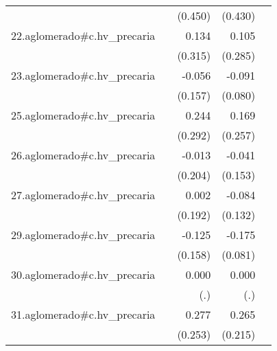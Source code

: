 {\begin{longtable}{l*{4}{D{.}{.}{-1}}}
            &                     &     (0.450)         &     (0.430)         &                     \\
\addlinespace
22.aglomerado#c.hv\_precaria&                     &       0.134         &       0.105         &                     \\
            &                     &     (0.315)         &     (0.285)         &                     \\
\addlinespace
23.aglomerado#c.hv\_precaria&                     &      -0.056         &      -0.091         &                     \\
            &                     &     (0.157)         &     (0.080)         &                     \\
\addlinespace
25.aglomerado#c.hv\_precaria&                     &       0.244         &       0.169         &                     \\
            &                     &     (0.292)         &     (0.257)         &                     \\
\addlinespace
26.aglomerado#c.hv\_precaria&                     &      -0.013         &      -0.041         &                     \\
            &                     &     (0.204)         &     (0.153)         &                     \\
\addlinespace
27.aglomerado#c.hv\_precaria&                     &       0.002         &      -0.084         &                     \\
            &                     &     (0.192)         &     (0.132)         &                     \\
\addlinespace
29.aglomerado#c.hv\_precaria&                     &      -0.125         &      -0.175\sym{*}  &                     \\
            &                     &     (0.158)         &     (0.081)         &                     \\
\addlinespace
30.aglomerado#c.hv\_precaria&                     &       0.000         &       0.000         &                     \\
            &                     &         (.)         &         (.)         &                     \\
\addlinespace
31.aglomerado#c.hv\_precaria&                     &       0.277         &       0.265         &                     \\
            &                     &     (0.253)         &     (0.215)         &                     \\

\end{longtable}}
